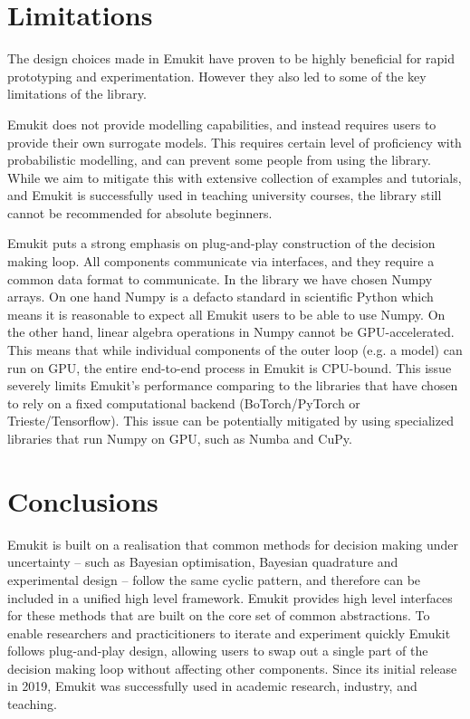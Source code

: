 

\section{Limitations}\label{section:limitations}
The design choices made in Emukit have proven to be highly beneficial for rapid prototyping and experimentation. However they also led to some of the key limitations of the library.

Emukit does not provide modelling capabilities, and instead requires users to provide their own surrogate models. This requires certain level of proficiency with probabilistic modelling, and can prevent some people from using the library. While we aim to mitigate this with extensive collection of examples and tutorials, and Emukit is successfully used in teaching university courses, the library still cannot be recommended for absolute beginners.

Emukit puts a strong emphasis on plug-and-play construction of the decision making loop. All components communicate via interfaces, and they require a common data format to communicate. In the library we have chosen Numpy arrays. On one hand Numpy is a defacto standard in scientific Python which means it is reasonable to expect all Emukit users to be able to use Numpy. On the other hand, linear algebra operations in Numpy cannot be GPU-accelerated. This means that while individual components of the outer loop  (e.g. a model) can run on GPU, the entire end-to-end process in Emukit is CPU-bound. This issue severely limits Emukit's performance comparing to the libraries that have chosen to rely on a fixed computational backend (BoTorch/PyTorch or Trieste/Tensorflow). This issue can be potentially mitigated by using specialized libraries that run Numpy on GPU, such as Numba and CuPy.

\section{Conclusions}
Emukit is built on a realisation that common methods for decision making under uncertainty -- such as Bayesian optimisation, Bayesian quadrature and experimental design -- follow the same cyclic pattern, and therefore can be included in a unified high level framework. Emukit provides high level interfaces for these methods that are built on the core set of common abstractions. To enable researchers and practicitioners to iterate and experiment quickly Emukit follows plug-and-play design, allowing users to swap out a single part of the decision making loop without affecting other components. Since its initial release in 2019, Emukit was successfully used in academic research, industry, and teaching.

